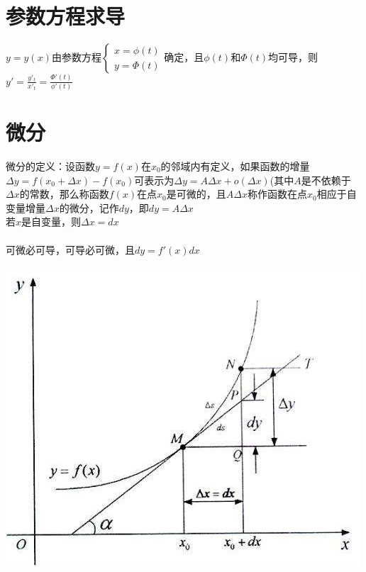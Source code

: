 \documentclass{article}
\begin{document}
\begin{flushleft}
	\section{参数方程求导}
	
	$y=y(x)$由参数方程$\left\{
	\begin{array}{rcl}
	x=\phi(t)\\
	y=\Phi(t)
	\end{array} \right.$确定，且$\phi(t)$和$\Phi(t)$均可导，则$y'=\frac{y'_t}{x'_t}=\frac{\Phi'(t)}{\phi'(t)}$\\
	
	\section{微分}
	
	微分的定义：设函数$y=f(x)$在$x_0$的邻域内有定义，如果函数的增量$\Delta y = f(x_0 + \Delta x) − f(x_0)$可表示为$ \Delta y = A\Delta x + o(\Delta x)$(其中$A$是不依赖于$\Delta x$的常数，那么称函数$f(x)$在点$x_0$是可微的，且$A\Delta x$称作函数在点$x_0$相应于自变量增量$\Delta x$的微分，记作$dy$，即$dy = A\Delta x$\\
	若$x$是自变量，则$\Delta x=dx$\\
	~\\
	可微必可导，可导必可微，且$dy=f'(x)dx$\\
	~\\
	\includegraphics[scale=1.0]{1.jpg}
	
\end{flushleft}
\end{document}
